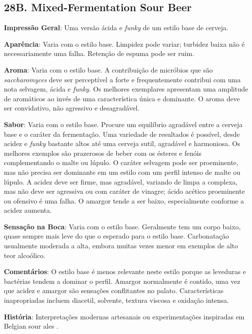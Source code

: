\subsection*{28B. Mixed-Fermentation Sour Beer}

\textbf{Impressão Geral}: Uma versão ácida e \textit{funky} de um estilo base de cerveja.

\textbf{Aparência}: Varia com o estilo base. Limpidez pode variar; turbidez baixa não é necessariamente uma falha. Retenção de espuma pode ser ruim.

\textbf{Aroma}: Varia com o estilo base. A contribuição de micróbios que são \textit{saccharomyces} deve ser perceptível a forte e frequentemente contribui com uma nota selvagem, ácida e \textit{funky}. Os melhores exemplares apresentam uma amplitude de aromáticos ao invés de uma característica única e dominante. O aroma deve ser convidativo, não agressivo e desagradável.

\textbf{Sabor}: Varia com o estilo base. Procure um equilíbrio agradável entre a cerveja base e o caráter da fermentação. Uma variedade de resultados é possível, desde acidez e \textit{funky} bastante altos até uma cerveja sutil, agradável e harmoniosa. Os melhores exemplos são prazerosos de beber com os ésteres e fenóis complementando o malte ou lúpulo. O caráter selvagem pode ser proeminente, mas não precisa ser dominante em um estilo com um perfil intenso de malte ou lúpulo. A acidez deve ser firme, mas agradável, variando de limpa a complexa, mas não deve ser agressiva ou com caráter de vinagre; ácido acético proeminente ou ofensivo é uma falha. O amargor tende a ser baixo, especialmente conforme a acidez aumenta.

\textbf{Sensação na Boca}: Varia com o estilo base. Geralmente tem um corpo baixo, quase sempre mais leve do que o esperado para o estilo base. Carbonatação usualmente moderada a alta, embora muitas vezes menor em exemplos de alto teor alcoólico.

\textbf{Comentários}: O estilo base é menos relevante neste estilo porque as leveduras e bactérias tendem a dominar o perfil. Amargor normalmente é contido, uma vez que acidez e amargor são sensações conflitantes no palato. Características inapropriadas incluem diacetil, solvente, textura viscosa e oxidação intensa.

\textbf{História}: Interpretações modernas artesanais ou experimentações inspiradas em Belgian sour ales .

